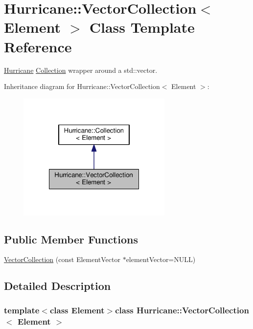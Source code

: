 \hypertarget{classHurricane_1_1VectorCollection}{\section{Hurricane\-:\-:Vector\-Collection$<$ Element $>$ Class Template Reference}
\label{classHurricane_1_1VectorCollection}
}


\hyperlink{namespaceHurricane}{Hurricane} \hyperlink{classHurricane_1_1Collection}{Collection} wrapper around a std\-::vector.  




Inheritance diagram for Hurricane\-:\-:Vector\-Collection$<$ Element $>$\-:\nopagebreak
\begin{figure}[H]
\begin{center}
\leavevmode
\includegraphics[width=216pt]{classHurricane_1_1VectorCollection__inherit__graph}
\end{center}
\end{figure}
\subsection*{Public Member Functions}
\begin{DoxyCompactItemize}
\item 
\hyperlink{classHurricane_1_1VectorCollection_a783d1c053ef4d46040db27bba255dfb8}{Vector\-Collection} (const Element\-Vector $\ast$element\-Vector=N\-U\-L\-L)
\end{DoxyCompactItemize}


\subsection{Detailed Description}
\subsubsection*{template$<$class Element$>$class Hurricane\-::\-Vector\-Collection$<$ Element $>$}


